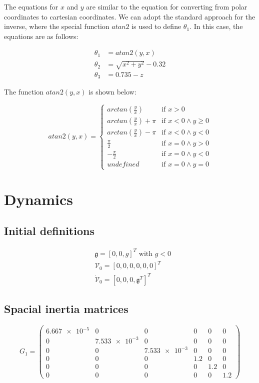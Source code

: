 \documentclass[]{scrreprt}
\begin{document}
The equations for $x$ and $y$ are similar to the equation for converting from polar coordinates to cartesian coordinates. We can adopt the standard approach for the inverse, where the special function $atan2$ is used to define $\theta_1$. In this case, the equations are as follows:

\begin{align}
\theta_1 &= atan2(y,x)\\
\theta_2 &= \sqrt{x^2+y^2}-0.32\\
\theta_3 &= 0.735-z
\end{align}

The function $atan2(y,x)$ is shown below:

\[
atan2(y,x) = \left\{
\begin{array}{ll}
arctan(\frac{y}{x}) & \textrm{if }x>0\\
arctan(\frac{y}{x}) + \pi & \textrm{if }x<0 \land y \ge 0\\
arctan(\frac{y}{x}) - \pi & \textrm{if }x<0 \land y < 0\\
\frac{\pi}{2} & \textrm{if } x = 0 \land y > 0\\
-\frac{\pi}{2} & \textrm{if } x = 0 \land y < 0\\
undefined & \textrm{if } x = 0 \land y = 0
\end{array}\right.
\]


\chapter{Dynamics}

\section{Initial definitions}
\begin{align*}
&\mathfrak{g} = [0,0,g]^T \textrm{ with } g < 0\\
&\mathcal{V}_0 = [0,0,0,0,0,0]^T\\
&\dot{\mathcal{V}}_0 = [0,0,0,\mathfrak{g}^T]^T
\end{align*}

\section{Spacial inertia matrices}

\[
G_1 = 
\left(
\begin{array}{ccccccc}
\num{+6.667e-5} & \num{0} & \num{0} & 0 & 0 & 0\\
\num{0} & \num{+7.533e-3} & \num{0} & 0 & 0 & 0\\
\num{0} & \num{0} & \num{+7.533e-3} & 0 & 0 & 0\\
0 & 0 & 0 & 1.2 & 0 & 0\\
0 & 0 & 0 & 0 & 1.2 & 0\\
0 & 0 & 0 & 0 & 0 & 1.2
\end{array}
\right)
\]
\end{document}
